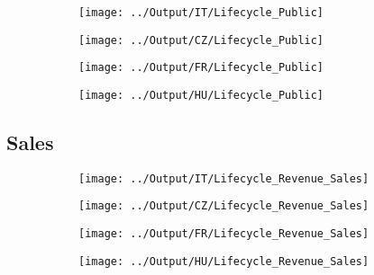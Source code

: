\documentclass[12pt,notitlepage]{article}
\begin{document}
\begin{figure}[!htpb]
\centering
\caption{Distribution of Public Firms across age}
\begin{subfigure}{.49\textwidth}
    \centering
 \texttt{[image: ../Output/IT/Lifecycle\_Public]}
\end{subfigure}%
\begin{subfigure}{.49\textwidth}
    \centering
 \texttt{[image: ../Output/CZ/Lifecycle\_Public]}
\end{subfigure}
\begin{subfigure}{.49\textwidth}
    \centering
 \texttt{[image: ../Output/FR/Lifecycle\_Public]}
\end{subfigure}%
\begin{subfigure}{.49\textwidth}
    \centering
 \texttt{[image: ../Output/HU/Lifecycle\_Public]}
\end{subfigure}
\end{figure}
\pagebreak


\subsection{Sales} %
\label{sec:sales}


\begin{figure}[!htpb]
\centering
\caption{Firm age and Revenue/Sales}
\begin{subfigure}{.49\textwidth}
    \centering
 \texttt{[image: ../Output/IT/Lifecycle\_Revenue\_Sales]}
\end{subfigure}%
\begin{subfigure}{.49\textwidth}
    \centering
 \texttt{[image: ../Output/CZ/Lifecycle\_Revenue\_Sales]}
\end{subfigure}
\begin{subfigure}{.49\textwidth}
    \centering
 \texttt{[image: ../Output/FR/Lifecycle\_Revenue\_Sales]}
\end{subfigure}%
\begin{subfigure}{.49\textwidth}
    \centering
 \texttt{[image: ../Output/HU/Lifecycle\_Revenue\_Sales]}
\end{subfigure}
\end{figure}
\pagebreak
\end{document}
